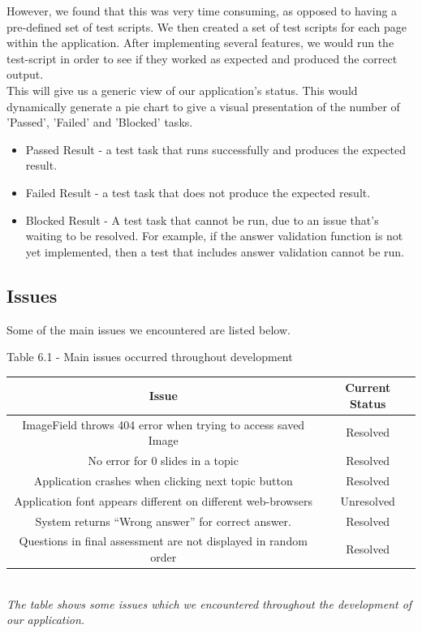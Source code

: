 \documentclass{l3proj}
\begin{document}
However, we found that this was very time consuming, as opposed to having a pre-defined set of test scripts. We then created a set of test scripts for each page within the application. After implementing several features, we would run the test-script in order to see if they worked as expected and produced the correct output.\\
This will give us a generic view of our application's status. This would dynamically generate a pie chart to give a visual presentation of the number of 'Passed', 'Failed' and 'Blocked' tasks.

\begin{itemize}
\item Passed Result - a test task that runs successfully and produces the expected result.
\item Failed Result - a test task that does not produce the expected result.
\item Blocked Result - A test task that cannot be run, due to an issue that's waiting to be resolved. For example, if the answer validation function is not yet implemented, then a test that includes answer validation cannot be run.
\end{itemize}

\subsection{Issues}

Some of the main issues we encountered are listed below.

\begin{center}
Table 6.1 - Main issues occurred throughout development\\
\begin{tabular}{|c|c|}
\hline \textbf{Issue} & \textbf{Current Status}\\
\hline 
\hline ImageField throws 404 error when trying to access saved Image & Resolved\\
\hline No error for 0 slides in a topic & Resolved\\
\hline Application crashes when clicking next topic button & Resolved\\
\hline Application font appears different on different web-browsers & Unresolved\\
\hline System returns ``Wrong answer'' for correct answer. & Resolved\\
\hline Questions in final assessment are not displayed in random order & Resolved\\
\hline
\end{tabular}\\
\textit{{\small The table shows some issues which we encountered throughout the development of our application.}}
\end{center}
\end{document}
